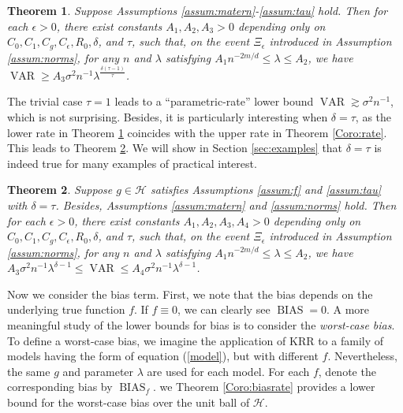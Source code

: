 \documentclass[12pt]{article}
\theoremstyle{plain}
\newtheorem{theorem}{Theorem}
\theoremstyle{remark}
\begin{document}
\begin{theorem}\label{Th:lower}
   Suppose Assumptions \ref{assum:matern}-\ref{assum:tau} hold. Then for each $\epsilon>0$, there exist constants $A_1,A_2,A_3>0$ depending only on $C_0,C_1,C_g,C_\epsilon,R_0,\delta$, and $\tau$, such that, on the event $\Xi_\epsilon$ introduced in Assumption \ref{assum:norms}, for any $n$ and $\lambda$ satisfying $A_1n^{-2m/d}\leq \lambda \leq A_2$, we have
   $\operatorname{VAR}\geq A_3\sigma^2n^{-1}\lambda^{\frac{\delta(\tau-1)}{\tau}}$.
  
\end{theorem}

The trivial case $\tau=1$ leads to a ``parametric-rate'' lower bound $\operatorname{VAR}\gtrsim \sigma^2 n^{-1}$, which is not surprising. Besides, it is particularly interesting when $\delta=\tau$, as the lower rate in Theorem \ref{Th:lower} coincides with the upper rate in Theorem \ref{Coro:rate}. This leads to Theorem \ref{Coro:varrate}. We will show in Section \ref{sec:examples} that $\delta=\tau$ is indeed true for many examples of practical interest.

\begin{theorem}\label{Coro:varrate}
    Suppose $g\in \mathcal{H}$ satisfies Assumptions \ref{assum:f} and \ref{assum:tau} with $\delta=\tau$. Besides, Assumptions \ref{assum:matern} and \ref{assum:norms} hold. Then for each $\epsilon>0$, there exist constants $A_1,A_2,A_3,A_4>0$ depending only on $C_0,C_1,C_g,C_\epsilon,R_0,\delta$, and $\tau$, such that, on the event $\Xi_\epsilon$ introduced in Assumption \ref{assum:norms}, for any $n$ and $\lambda$ satisfying $A_1n^{-2m/d}\leq \lambda \leq A_2$, we have
   $A_3\sigma^2n^{-1}\lambda^{\delta-1}\leq \operatorname{VAR}\leq A_4\sigma^2n^{-1}\lambda^{\delta-1}$.
\end{theorem}

Now we consider the bias term. First, we note that the bias depends on the underlying true function $f$. If $f\equiv 0$, we can clearly see $\operatorname{BIAS}=0$. A more meaningful study of the lower bounds for bias is to consider the \textit{worst-case bias}. To define a worst-case bias, we imagine the application of KRR to a family of
models having the form of equation (\ref{model}), but with different $f$. Nevertheless, the same $g$ and parameter $\lambda$ are used for each model. For each $f$, denote the corresponding bias by $\operatorname{BIAS}_f$. we Theorem \ref{Coro:biasrate} provides a lower bound for the worst-case bias over the unit ball of $\mathcal{H}$.
\end{document}

